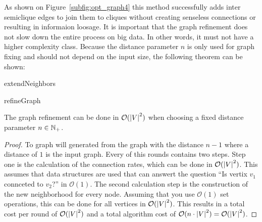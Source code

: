 As shown on Figure~\ref{subfig:opt_graph4} this method successfully adds inter semiclique edges to join them to cliques without creating senseless connections or resulting in informaion loosage. It is important that the graph refinement does not slow down the entire process on big data. In other words, it must not have a higher complexity class. Because the distance parameter $n$ is only used for graph fixing and should not depend on the input size, the following theorem can be shown:

\begin{algorithm}


	\caption{extendNeighbors}
\end{algorithm}

\begin{algorithm}


	\caption{refineGraph}
\end{algorithm}

\begin{envtheo}
	The graph refinement can be done in $\mathcal{O} ( \left|V\right|^2 )$ when choosing a fixed distance parameter $n \in \mathbb{N}_+$.
\end{envtheo}
\begin{proof}
	To graph will generated from the graph with the distance $n-1$ where a distance of $1$ is the input graph. Every of this rounds contains two steps. Step one is the calculation of the connection rates, which can be done in $\mathcal{O} ( \left|V\right|^2 )$. This assumes that data structures are used that can answert the question ``Is vertix $v_1$ connceted to $v_2$?'' in $\mathcal{O} ( 1 )$. The second calculation step is the construction of the new neighborhood for every node. Assuming that you use $\mathcal{O} ( 1 )$ set operations, this can be done for all vertices in $\mathcal{O} ( \left|V\right|^2 )$. This results in a total cost per round of $\mathcal{O} ( \left|V\right|^2 )$ and a total algorithm cost of $\mathcal{O} ( n \cdot \left|V\right|^2 ) = \mathcal{O} ( \left|V\right|^2 )$.
\end{proof}

